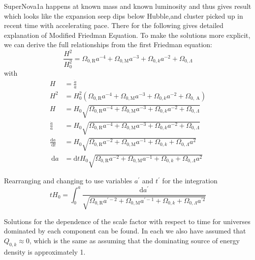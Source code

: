 \documentclass[10pt]{article}
\begin{document}
SuperNova1a happens at known mass and known luminosity and thus gives result which looks like the expansion seep dips below Hubble,and cluster picked up  in recent time with accelerating pace.
There for the following gives detailed explanation of Modified Friedman Equation.
To make the solutions more explicit, we can derive the full relationships from the first Friedman equation:
$$
\frac{H^2}{H_0^2}=\Omega_{0, \mathrm{R}} a^{-4}+\Omega_{0, \mathrm{M}} a^{-3}+\Omega_{0, k} a^{-2}+\Omega_{0, \Lambda}
$$
with
$$
\begin{aligned}
H & =\frac{\dot{a}}{a} \\
H^2 & =H_0^2\left(\Omega_{0, \mathrm{R}} a^{-4}+\Omega_{0, \mathrm{M}} a^{-3}+\Omega_{0, k} a^{-2}+\Omega_{0, \mathrm{~A}}\right) \\
H & =H_0 \sqrt{\Omega_{0, \mathrm{R}} a^{-4}+\Omega_{0, \mathrm{M}} a^{-3}+\Omega_{0, k} a^{-2}+\Omega_{0, \Lambda}} \\
\frac{\dot{a}}{a} & =H_0 \sqrt{\Omega_{0, \mathrm{R}} a^{-4}+\Omega_{0, \mathrm{M}} a^{-3}+\Omega_{0, k} a^{-2}+\Omega_{0, \Lambda}} \\
\frac{\mathrm{d} a}{\mathrm{~d} t} & =H_0 \sqrt{\Omega_{0, \mathrm{R}} a^{-2}+\Omega_{0, \mathrm{M}} a^{-1}+\Omega_{0, k}+\Omega_{0, \Lambda} a^2} \\
\mathrm{~d} a & =\mathrm{d} t H_0 \sqrt{\Omega_{0, \mathrm{R}} a^{-2}+\Omega_{0, \mathrm{M}} a^{-1}+\Omega_{0, k}+\Omega_{0, \Lambda} a^2}
\end{aligned}
$$

Rearranging and changing to use variables $a^{\prime}$ and $t^{\prime}$ for the integration
$$
t H_0=\int_0^a \frac{\mathrm{d} a^{\prime}}{\sqrt{\Omega_{0, \mathrm{R}} a^{\prime-2}+\Omega_{0, \mathrm{M}} a^{\prime-1}+\Omega_{0, k}+\Omega_{0, \Lambda} a^{\prime 2}}}
$$

Solutions for the dependence of the scale factor with respect to time for universes dominated by each component can be found. In each we also have assumed that $Q_{0, k} \approx 0$, which is the same as assuming that the dominating source of energy density is approximately 1.
\end{document}
